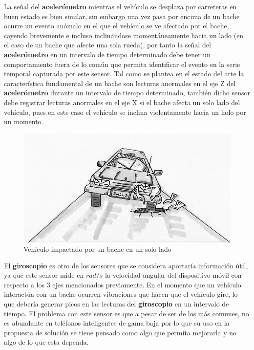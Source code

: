 	La señal del \textbf{acelerómetro} mientras el vehículo se desplaza por carreteras en buen estado es bien similar,
	sin embargo una vez pasa por encima de un bache ocurre un evento anómalo en el que el vehículo se ve afectado
	por el bache, cayendo brevemente e incluso inclinándose momentáneamente hacia un lado (en el caso de un bache
	que afecte una sola rueda), por tanto la señal del \textbf{acelerómetro} en un intervalo de tiempo determinado debe tener
	un comportamiento fuera de lo común que permita identificar el evento en la serie temporal capturada por este sensor.
	Tal como se plantea en el estado del arte la característica fundamental de un bache son lecturas anormales en el eje
	Z del \textbf{acelerómetro} durante un intervalo de tiempo determinado, también dicho sensor debe registrar lecturas
	anormales en el eje X si el bache afecta un solo lado del vehículo, pues en este caso el vehículo se inclina violentamente
	hacia un lado por un momento.\\

	\begin{figure}[htb]
		\centering
		\includegraphics[scale = 0.5]{Graphics/one_side_pothole_vehicle.jpg}
		\caption{Vehículo impactado por un bache en un solo lado}
		\label{fig:2}
	\end{figure}

	El \textbf{giroscopio} es otro de los sensores que se considera aportaría información útil, ya que este sensor 
	mide en $rad/s$ la velocidad angular del dispositivo móvil con respecto a los 3 ejes mencionados previamente. 
	En el momento que un vehículo interactúa con un bache ocurren vibraciones que hacen que el vehículo gire, lo que
	debería generar picos en las lecturas del \textbf{giroscopio} en un intervalo de tiempo. El problema con este sensor es 
	que a pesar de ser de los más comunes, no es abundante en teléfonos inteligentes de gama baja por lo que 
	su uso en la propuesta de solución se tiene pensado como algo que permita mejorarla y no algo de lo que esta
	dependa.\\

